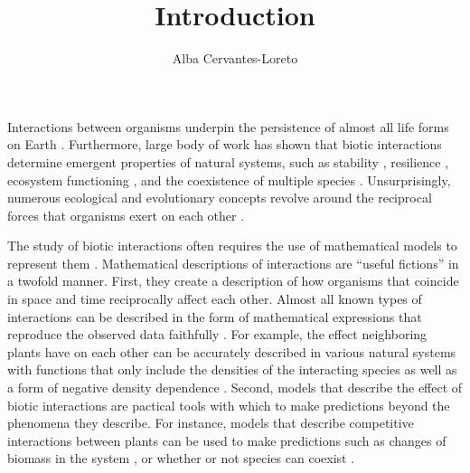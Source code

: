 \documentclass[12pt]{article}
\title{Introduction}
\author[1]{Alba Cervantes-Loreto}
\date{}
\begin{document}
\linenumbers
\baselineskip30pt
\maketitle


Interactions between organisms underpin the persistence of almost all life forms on Earth \citep{lawton1999there}. Furthermore, large body of work has shown that biotic interactions determine emergent properties of natural systems, such as stability \citep{may1972will, wootton2016many,song2018will}, resilience \citep{capdevila2021reconciling}, ecosystem functioning \citep{turnbull2013coexistence,godoy2020excess}, and the coexistence of multiple species \citep{chesson2000mechanisms,saavedra2017structural}. Unsurprisingly, numerous ecological and evolutionary concepts revolve around the reciprocal forces that organisms exert on each other \citep{gause_experimental_1934,macarthur1967limiting,thompson1999evolution, hillerislambers2012rethinking, chase2009ecological}.

The study of biotic interactions often requires the use of mathematical models to represent them \citep{maynard1978models}. Mathematical descriptions of interactions are ``useful fictions'' \citep{box2011statistical} in a twofold manner. First, they create a description of how organisms that coincide in space and time reciprocally affect each other. Almost all known types of interactions can be described in the form of mathematical expressions that reproduce the observed data faithfully \citep{volterra1926fluctuations,holling1959some,holt1977predation,adler2018competition,wood1999super,holland2002population,vazquez2005interaction,stouffer2021hidden} . For example, the effect neighboring plants have on each other can be accurately described in various natural systems with functions that only include the densities of the interacting species as well as a form of negative density dependence \citep{adler2018competition,hart2018quantify}. Second, models that describe the effect of biotic interactions are pactical tools with which to make predictions beyond the phenomena they describe. For instance, models that describe competitive interactions between plants can be used  to make predictions such as changes of biomass in the system \citep{fox2003long,godoy2020excess}, or whether or not species can coexist \citep{levine2009importance,godoy_phylogenetic_2014}.
\end{document}
